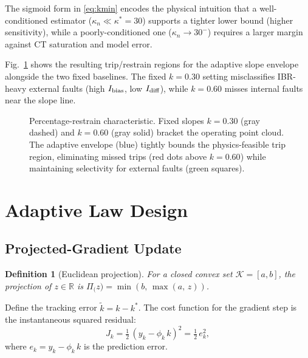 \documentclass[journal]{IEEEtran}
\newtheorem{definition}{Definition}
\newcommand{\kappan}{\kappa_{n}}
\newcommand{\ktilde}{\tilde{k}}
\newcommand{\kstar}{k^*}
\newcommand{\Idiff}{I_{\rm diff}}
\newcommand{\Ibias}{I_{\rm bias}}
\newcommand{\Proj}[1]{\Pi_{#1}}
\newcommand{\calK}{\mathcal{K}}
\begin{document}
The sigmoid form in \eqref{eq:kmin} encodes the physical intuition
that a well-conditioned estimator ($\kappan \ll \kappa^* = 30$)
supports a tighter lower bound (higher sensitivity), while a
poorly-conditioned one ($\kappan \to 30^-$) requires a larger margin
against CT saturation and model error.

Fig.~\ref{fig:slope_char} shows the resulting trip/restrain regions
for the adaptive slope envelope alongside the two fixed baselines.
The fixed $k = 0.30$ setting misclassifies IBR-heavy external faults
(high $\Ibias$, low $\Idiff$), while $k = 0.60$ misses internal faults
near the slope line.

\begin{figure}[!t]
  \centering
  
  \caption{Percentage-restrain characteristic.
           Fixed slopes $k=0.30$ (gray dashed) and $k=0.60$ (gray solid)
           bracket the operating point cloud.  The adaptive envelope
           (blue) tightly bounds the physics-feasible trip region,
           eliminating missed trips (red dots above $k=0.60$) while
           maintaining selectivity for external faults (green squares).}
  \label{fig:slope_char}
\end{figure}

\section{Adaptive Law Design}
\label{sec:law}

\subsection{Projected-Gradient Update}

\begin{definition}[Euclidean projection]
For a closed convex set $\calK = [a,b]$, the projection of
$z \in \mathbb{R}$ is
$\Proj(z) = \min(b,\, \max(a,\, z))$.
\end{definition}

Define the tracking error $\ktilde = k - \kstar$.  The cost function
for the gradient step is the instantaneous squared residual:
\begin{equation}
  J_k = \tfrac{1}{2}\,(y_k - \phi_k\,k)^2 = \tfrac{1}{2}\,e_k^2,
  \label{eq:cost}
\end{equation}
where $e_k = y_k - \phi_k\,k$ is the prediction error.
\end{document}
